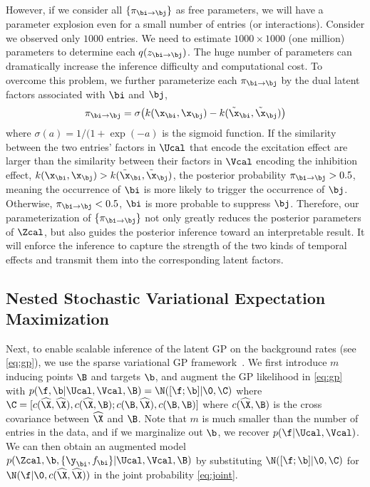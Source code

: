 However, if we consider all $\{\pi_{\bi \rightarrow \bj}\}$ as free parameters, we will have a parameter explosion even for a small number of entries (or interactions).  Consider we observed only $1000$ entries. We need to estimate $1000 \times 1000$ (\ie one million) parameters  to determine each $q(z_{\bi \rightarrow \bj})$. The huge number of parameters can dramatically  increase the  inference difficulty and computational cost. To overcome this problem, we further parameterize each $\pi_{\bi \rightarrow \bj}$ by the dual latent factors associated with $\bi$ and $\bj$, %
\begin{align}
\pi_{\bi \rightarrow \bj} = \sigma\big(k(\x_{\bi}, \x_{\bj}) - k(\tilde{\x}_{\bi}, \tilde{\x}_{\bj})\big)  \label{eq:pi} 
\end{align}
where $\sigma(a) = 1/(1+ \exp(-a)$ is  the sigmoid function. If the similarity between the two entries' factors in $\Ucal$ that encode the excitation effect are larger than the similarity between their factors in $\Vcal$ encoding the inhibition effect, \ie $k(\x_{\bi}, \x_{\bj}) > k(\tilde{\x}_{\bi}, \tilde{\x}_\bj)$, the posterior probability $\pi_{\bi \rightarrow \bj} > 0.5$, meaning the occurrence of $\bi$ is more likely to trigger the occurrence of  $\bj$. Otherwise, $\pi_{\bi \rightarrow \bj} < 0.5$, $\bi$ is more probable to suppress $\bj$. Therefore, our parameterization of $\{\pi_{\bi \rightarrow \bj}\}$ not only greatly reduces the posterior parameters of $\Zcal$, but also guides the posterior inference toward an interpretable result. It will enforce the inference to capture the strength of the two kinds of temporal effects and transmit them into the corresponding latent factors. %
	
\subsection{Nested Stochastic Variational Expectation Maximization}
Next, to enable scalable inference of the latent GP on the background rates (see \eqref{eq:gp}), we use the sparse variational GP framework~\citep{titsias2009variational,hensman2013gaussian}.  We first introduce $m$ inducing points $\B$ and targets $\b$,  and augment the GP likelihood in \eqref{eq:gp} with $p(\f, \b|\Ucal, \Vcal, \B) = \N([\f;\b]|\0, \C)$ where $\C = [c(\widehat{\X}, \widehat{\X}), c(\widehat{\X}, \B); c(\B, \widehat{\X}), c(\B, \B)]$ where $c(\widehat{\X}, \B)$ is the cross covariance between $\widehat{\X}$ and $\B$. Note that $m$ is much smaller than the number of entries in the data, and if we marginalize out $\b$, we recover $p(\f|\Ucal, \Vcal)$. We can then obtain an augmented model $p(\Zcal, \b, \{\y_\bi, f_{\bi}\}|\Ucal, \Vcal, \B)$ by substituting $\N([\f;\b]|\0, \C)$ for  $\N(\f|\0, c(\widehat{\X}, \widehat{\X}))$ in the joint probability \eqref{eq:joint}.

